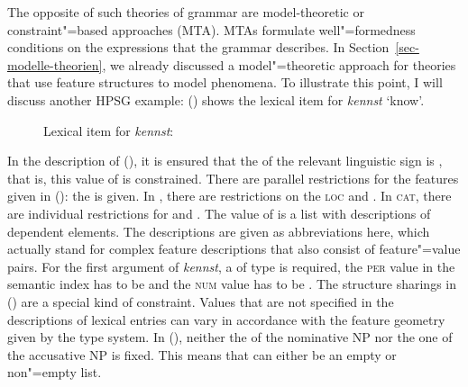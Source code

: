 The opposite of such theories of grammar are model-theoretic or constraint"=based approaches (MTA).
MTAs formulate well"=formedness conditions on the expressions that the grammar describes.
In Section~\ref{sec-modelle-theorien}, we already discussed a model"=theoretic approach for theories that use
feature structures to model phenomena. To illustrate this point, I will discuss another HPSG example:
() shows the lexical item for \emph{kennst} `know'. %
\begin{figure}
\eas
Lexical item for \emph{kennst}:\\
\label{le-kennst-mts}%
\zs
\vspace{-2\baselineskip}
\end{figure}
In the description of (), it is ensured that the \phonv of the relevant linguistic sign is
, that is, this value of \phon is constrained. There are parallel restrictions for the features given in (): the \synsemv
is given. In \synsem, there are restrictions on the \textsc{loc} and \nonlocv. In \textsc{cat}, there are
individual restrictions for \head and \comps. The value of \comps is a list with descriptions of dependent
elements. The descriptions are given as abbreviations here, which actually stand for complex feature descriptions that also
consist of feature"=value pairs. For the first argument of \emph{kennst}, a \headv of type 
 is required, the \textsc{per} value in the semantic index has to be  and the
 \textsc{num} value has to be . The structure sharings in () are a special kind of constraint. Values that
 are not specified in the descriptions of lexical entries can vary in accordance with the feature geometry given by the type
 system. In (), neither the \slashv of the nominative NP nor the one of the accusative NP is fixed. This means that \slasch can
 either be an empty or non"=empty list.

